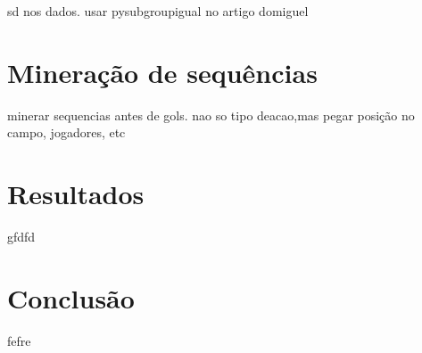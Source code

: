 \documentclass{article}
\begin{document}
sd nos dados. usar pysubgroupigual no artigo domiguel

\section{Mineração de sequências}

minerar sequencias antes de gols. nao so tipo deacao,mas pegar posição no
campo, jogadores, etc

\section{Resultados}

gfdfd

\section{Conclusão}

fefre

\newpage

\renewcommand{\refname}{Referências Bibliográficas}

\nocite{*}
\end{document}
